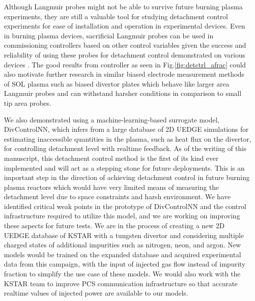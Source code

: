 Although Langmuir probes might not be able to survive future burning plasma experiments, they are still a valuable tool for studying detachment control experiments for ease of installation and operation in experimental devices.
Even in burning plasma devices, sacrificial Langmuir probes can be used in commissioning controllers based on other control variables given the success and reliability of using these probes for detachment control demonstrated on various devices \cite{Eldon_2021_NME, Guillemaut_2017_PPCF, Yuan_2020_FED}.
The good results from \Afrac controller as seen in Fig.\ref{fig:detctrl_afrac} could also motivate further research in similar biased electrode measurement methods of SOL plasma such as biased divertor plates \cite{Toi_2023_NF, Cui_2024_NF} which behave like larger area Langmuir probes and can withstand harsher conditions in comparison to small tip area probes.

We also demonstrated using a machine-learning-based surrogate model, DivControlNN, which infers from a large database of 2D UEDGE simulations for estimating inaccessible quantities in the plasma, such as heat flux on the divertor, for controlling detachment level with realtime feedback.
As of the writing of this manuscript, this detachment control method is the first of its kind ever implemented and will act as a stepping stone for future deployments.
This is an important step in the direction of achieving detachment control in future burning plasma reactors which would have very limited means of measuring the detachment level due to space constraints and harsh environment.
We have identified critical weak points in the prototype of DivControlNN and the control infrastructure required to utilize this model, and we are working on improving these aspects for future tests.
We are in the process of creating a new 2D UEDGE database of KSTAR with a tungsten divertor and considering multiple charged states of additional impurities such as nitrogen, neon, and argon.
New models would be trained on the expanded database and acquired experimental data from this campaign, with the input of injected gas flow instead of impurity fraction to simplify the use case of these models.
We would also work with the KSTAR team to improve PCS communication infrastructure so that accurate realtime values of injected power are available to our models.

